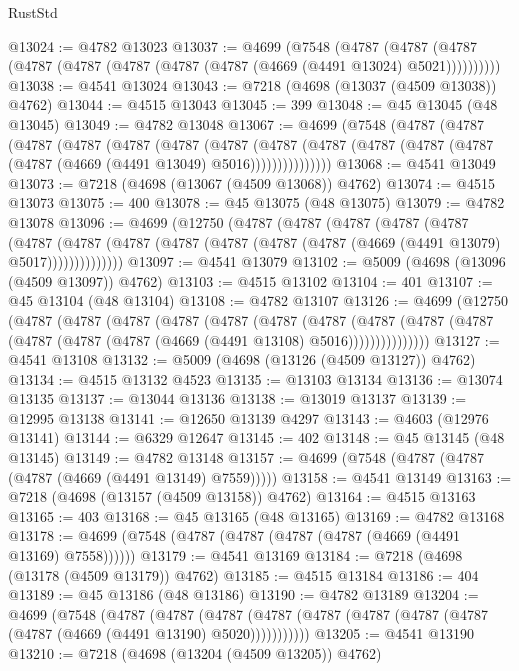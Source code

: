 \begin{lexlean}{RustStd}
\begin{coremodule}
@13024 := @4782 @13023
@13037 := @4699
    (@7548
      (@4787 (@4787 (@4787 (@4787 (@4787 (@4787 (@4787 (@4787 (@4669 (@4491 @13024) @5021))))))))))
@13038 := @4541 @13024
@13043 := @7218 (@4698 (@13037 (@4509 @13038)) @4762)
@13044 := @4515 @13043
@13045 := 399
@13048 := @45 @13045 (@48 @13045)
@13049 := @4782 @13048
@13067 := @4699
    (@7548
      (@4787
        (@4787
          (@4787
            (@4787
              (@4787
                (@4787
                  (@4787
                    (@4787
                      (@4787 (@4787 (@4787 (@4787 (@4787 (@4669 (@4491 @13049) @5016)))))))))))))))
@13068 := @4541 @13049
@13073 := @7218 (@4698 (@13067 (@4509 @13068)) @4762)
@13074 := @4515 @13073
@13075 := 400
@13078 := @45 @13075 (@48 @13075)
@13079 := @4782 @13078
@13096 := @4699
    (@12750
      (@4787
        (@4787
          (@4787
            (@4787
              (@4787
                (@4787
                  (@4787
                    (@4787 (@4787 (@4787 (@4787 (@4787 (@4669 (@4491 @13079) @5017))))))))))))))
@13097 := @4541 @13079
@13102 := @5009 (@4698 (@13096 (@4509 @13097)) @4762)
@13103 := @4515 @13102
@13104 := 401
@13107 := @45 @13104 (@48 @13104)
@13108 := @4782 @13107
@13126 := @4699
    (@12750
      (@4787
        (@4787
          (@4787
            (@4787
              (@4787
                (@4787
                  (@4787
                    (@4787
                      (@4787 (@4787 (@4787 (@4787 (@4787 (@4669 (@4491 @13108) @5016)))))))))))))))
@13127 := @4541 @13108
@13132 := @5009 (@4698 (@13126 (@4509 @13127)) @4762)
@13134 := @4515 @13132 @4523
@13135 := @13103 @13134
@13136 := @13074 @13135
@13137 := @13044 @13136
@13138 := @13019 @13137
@13139 := @12995 @13138
@13141 := @12650 @13139 @4297
@13143 := @4603 (@12976 @13141)
@13144 := @6329 @12647
@13145 := 402
@13148 := @45 @13145 (@48 @13145)
@13149 := @4782 @13148
@13157 := @4699 (@7548 (@4787 (@4787 (@4787 (@4669 (@4491 @13149) @7559)))))
@13158 := @4541 @13149
@13163 := @7218 (@4698 (@13157 (@4509 @13158)) @4762)
@13164 := @4515 @13163
@13165 := 403
@13168 := @45 @13165 (@48 @13165)
@13169 := @4782 @13168
@13178 := @4699 (@7548 (@4787 (@4787 (@4787 (@4787 (@4669 (@4491 @13169) @7558))))))
@13179 := @4541 @13169
@13184 := @7218 (@4698 (@13178 (@4509 @13179)) @4762)
@13185 := @4515 @13184
@13186 := 404
@13189 := @45 @13186 (@48 @13186)
@13190 := @4782 @13189
@13204 := @4699
    (@7548
      (@4787
        (@4787
          (@4787 (@4787 (@4787 (@4787 (@4787 (@4787 (@4787 (@4669 (@4491 @13190) @5020)))))))))))
@13205 := @4541 @13190
@13210 := @7218 (@4698 (@13204 (@4509 @13205)) @4762)

\end{coremodule}
\end{lexlean}
